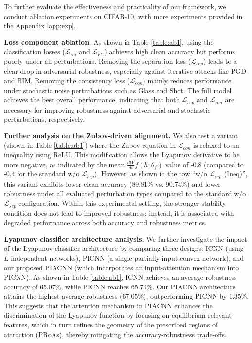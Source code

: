 \documentclass[journal]{IEEEtran}
\begin{document}
To further evaluate the effectiveness and practicality of our framework, we conduct ablation experiments on CIFAR-10, with more experiments provided in the Appendix \ref{app:exp}.

\noindent \textbf{Loss component ablation.} As shown in Table \ref{table:ab1}, using the classification losses ($\mathcal{L}_{cla}$ and $\mathcal{L}_{FC}$) achieves high clean accuracy but performs poorly under all perturbations. Removing the separation loss ($\mathcal{L}_{sep}$) leads to a clear drop in adversarial robustness, especially against iterative attacks like PGD and BIM. Removing the consistency loss ($\mathcal{L}_{con}$) mainly reduces performance under stochastic noise perturbations such as Glass and Shot. The full model achieves the best overall performance, indicating that both $\mathcal{L}_{sep}$ and $\mathcal{L}_{con}$ are necessary for improving robustness against adversarial and stochastic perturbations, respectively.

\noindent \textbf{Further analysis on the Zubov-driven alignment.} We also test a variant (shown in Table \ref{table:ab1}) where the Zubov equation in $\mathcal{L}_{con}$ is relaxed to an inequality using ReLU. This modification allows the Lyapunov derivative to be more negative, as indicated by the mean $\frac{dW}{dt}f(h;\theta_f)$ value of ‑0.8 (compared to ‑0.4 for the standard w/o $\mathcal{L}_{sep}$). However, as shown in the row ``w/o $\mathcal{L}_{sep}$ (Ineq)'', this variant exhibits lower clean accuracy (89.81\% vs. 90.74\%) and lower robustness under all evaluated perturbation types compared to the standard w/o $\mathcal{L}_{sep}$ configuration. Within this experimental setting, the stronger stability condition does not lead to improved robustness; instead, it is associated with degraded performance across both accuracy and robustness metrics.

\noindent \textbf{Lyapunov classifier architecture analysis.}
We further investigate the impact of the Lyapunov classifier architecture by comparing three designs: ICNN (using $L$ independent networks), PICNN (a single partially input-convex network), and our proposed PIACNN (which incorporates an input-attention mechanism into PICNN). As shown in Table \ref{table:ab1}, ICNN achieves an average robustness accuracy of 65.07\%, while PICNN reaches 65.70\%. Our PIACNN architecture attains the highest average robustness (67.05\%), outperforming PICNN by 1.35\%. This suggests that the attention mechanism in PIACNN enhances the discrimination of the Lyapunov function by focusing on equilibrium-relevant features, which in turn refines the geometry of the prescribed regions of attraction (PRoAs), thereby mitigating the accuracy-robustness trade-offs.
\end{document}
